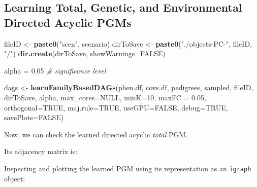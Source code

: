 \documentclass[]{article}
\newenvironment{Shaded}{\begin{snugshade}}{\end{snugshade}}
\newcommand{\KeywordTok}[1]{\textcolor[rgb]{0.13,0.29,0.53}{\textbf{#1}}}
\newcommand{\DataTypeTok}[1]{\textcolor[rgb]{0.13,0.29,0.53}{#1}}
\newcommand{\DecValTok}[1]{\textcolor[rgb]{0.00,0.00,0.81}{#1}}
\newcommand{\FloatTok}[1]{\textcolor[rgb]{0.00,0.00,0.81}{#1}}
\newcommand{\StringTok}[1]{\textcolor[rgb]{0.31,0.60,0.02}{#1}}
\newcommand{\CommentTok}[1]{\textcolor[rgb]{0.56,0.35,0.01}{\textit{#1}}}
\newcommand{\OtherTok}[1]{\textcolor[rgb]{0.56,0.35,0.01}{#1}}
\newcommand{\OperatorTok}[1]{\textcolor[rgb]{0.81,0.36,0.00}{\textbf{#1}}}
\newcommand{\NormalTok}[1]{#1}
\begin{document}
\subsection{Learning Total, Genetic, and Environmental Directed Acyclic
PGMs}\label{learning-total-genetic-and-environmental-directed-acyclic-pgms}

\begin{Shaded}
\begin{Highlighting}[]
\NormalTok{fileID <-}\StringTok{ }\KeywordTok{paste0}\NormalTok{(}\StringTok{"scen"}\NormalTok{, scenario)}
\NormalTok{dirToSave <-}\StringTok{ }\KeywordTok{paste0}\NormalTok{(}\StringTok{"./objects-PC-"}\NormalTok{, fileID, }\StringTok{"/"}\NormalTok{)}
\KeywordTok{dir.create}\NormalTok{(dirToSave, }\DataTypeTok{showWarnings=}\OtherTok{FALSE}\NormalTok{)}

\NormalTok{alpha =}\StringTok{ }\FloatTok{0.05} \CommentTok{# significance level}

\NormalTok{dags <-}\StringTok{ }\KeywordTok{learnFamilyBasedDAGs}\NormalTok{(phen.df, covs.df, pedigrees, sampled,}
\NormalTok{   fileID, dirToSave, alpha, }\DataTypeTok{max_cores=}\OtherTok{NULL}\NormalTok{,}
   \DataTypeTok{minK=}\DecValTok{10}\NormalTok{, }\DataTypeTok{maxFC =} \FloatTok{0.05}\NormalTok{, }\DataTypeTok{orthogonal=}\OtherTok{TRUE}\NormalTok{, }\DataTypeTok{maj.rule=}\OtherTok{TRUE}\NormalTok{,}
   \DataTypeTok{useGPU=}\OtherTok{FALSE}\NormalTok{, }\DataTypeTok{debug=}\OtherTok{TRUE}\NormalTok{, }\DataTypeTok{savePlots=}\OtherTok{FALSE}\NormalTok{)}
\end{Highlighting}
\end{Shaded}

Now, we can check the learned directed acyclic \emph{total} PGM.

Its adjacency matrix is:

\begin{Shaded}
\end{Shaded}

Inspecting and plotting the learned PGM using its representation as an
\texttt{igraph} object:
\end{document}
